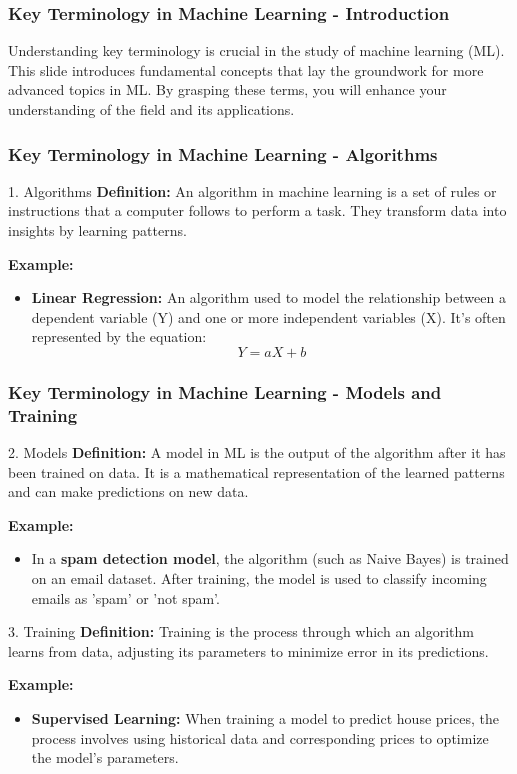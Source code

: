 \documentclass[aspectratio=169]{beamer}
\begin{document}
\begin{frame}[fragile]
    \frametitle{Key Terminology in Machine Learning - Introduction}
    Understanding key terminology is crucial in the study of machine learning (ML). This slide introduces fundamental concepts that lay the groundwork for more advanced topics in ML. 
    By grasping these terms, you will enhance your understanding of the field and its applications.
\end{frame}

\begin{frame}[fragile]
    \frametitle{Key Terminology in Machine Learning - Algorithms}
    \begin{block}{1. Algorithms}
        \textbf{Definition:} An algorithm in machine learning is a set of rules or instructions that a computer follows to perform a task. They transform data into insights by learning patterns.
    \end{block}
    
    \textbf{Example:} 
    \begin{itemize}
        \item \textbf{Linear Regression:} An algorithm used to model the relationship between a dependent variable (Y) and one or more independent variables (X). It's often represented by the equation:  
        \begin{equation}
            Y = aX + b
        \end{equation}
    \end{itemize} 
\end{frame}

\begin{frame}[fragile]
    \frametitle{Key Terminology in Machine Learning - Models and Training}
    \begin{block}{2. Models}
        \textbf{Definition:} A model in ML is the output of the algorithm after it has been trained on data. It is a mathematical representation of the learned patterns and can make predictions on new data.
    \end{block}
    
    \textbf{Example:} 
    \begin{itemize}
        \item In a \textbf{spam detection model}, the algorithm (such as Naive Bayes) is trained on an email dataset. After training, the model is used to classify incoming emails as 'spam' or 'not spam'.
    \end{itemize} 

    \begin{block}{3. Training}
        \textbf{Definition:} Training is the process through which an algorithm learns from data, adjusting its parameters to minimize error in its predictions.
    \end{block}

    \textbf{Example:} 
    \begin{itemize}
        \item \textbf{Supervised Learning:} When training a model to predict house prices, the process involves using historical data and corresponding prices to optimize the model's parameters.
    \end{itemize} 
\end{frame}
\end{document}
